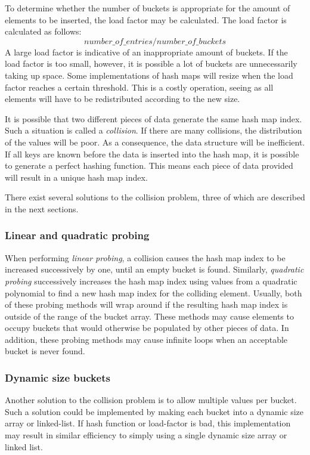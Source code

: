 \documentclass{article}
\begin{document}
To determine whether the number of buckets is appropriate for the amount of elements to be inserted,
the load factor may be calculated. The load factor is calculated as follows:
\[number\_of\_entries / number\_of\_buckets\]
A large load factor is indicative of an inappropriate amount of buckets.
If the load factor is too small, however, it is possible a lot of buckets are unnecessarily taking up space.
Some implementations of hash maps will resize when the load factor reaches a certain threshold.
This is a costly operation, seeing as all elements will have to be redistributed according to the new size.

It is possible that two different pieces of data generate the same hash map index.
Such a situation is called a {\em collision}. If there are many collisions, the distribution of the values
will be poor. As a consequence, the data structure will be inefficient.
If all keys are known before the data is inserted into the hash map, it is possible to generate a perfect
hashing function. This means each piece of data provided will result in a unique hash map index.

There exist several solutions to the collision problem, three of which are described in the next sections.

\subsubsection{Linear and quadratic probing}
When performing {\em linear probing}, a collision causes the hash map index to be increased successively by one,
until an empty bucket is found. Similarly, {\em quadratic probing} successively increases the hash map index using
values from a quadratic polynomial to find a new hash map index for the colliding element.
Usually, both of these probing methods will wrap around if the resulting hash map index is outside of the range
of the bucket array. These methods may cause elements to occupy buckets that would otherwise be populated by
other pieces of data. In addition, these probing methods may cause infinite loops when an acceptable bucket is
never found.

\subsubsection{Dynamic size buckets}
Another solution to the collision problem is to allow multiple values per bucket. Such a solution could be
implemented by making each bucket into a dynamic size array or linked-list. If hash function or load-factor is bad,
this implementation may result in similar efficiency to simply using a single dynamic size array or linked list.
\end{document}
